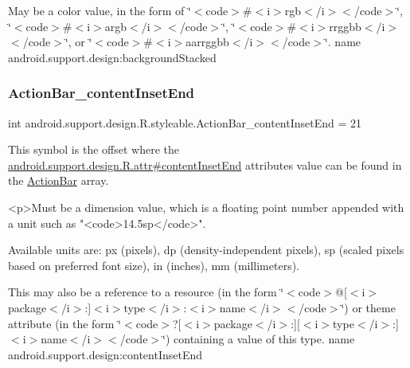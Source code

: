 May be a color value, in the form of \char`\"{}$<$code$>$\#$<$i$>$rgb$<$/i$>$$<$/code$>$\char`\"{}, \char`\"{}$<$code$>$\#$<$i$>$argb$<$/i$>$$<$/code$>$\char`\"{}, \char`\"{}$<$code$>$\#$<$i$>$rrggbb$<$/i$>$$<$/code$>$\char`\"{}, or \char`\"{}$<$code$>$\#$<$i$>$aarrggbb$<$/i$>$$<$/code$>$\char`\"{}.  name android.\+support.\+design\+:background\+Stacked \mbox{\label{classandroid_1_1support_1_1design_1_1R_1_1styleable_afbb050c8aaf116cb242a091ccb7c5494}} 
\subsubsection{\texorpdfstring{Action\+Bar\+\_\+content\+Inset\+End}{ActionBar\_contentInsetEnd}}
{\footnotesize\ttfamily int android.\+support.\+design.\+R.\+styleable.\+Action\+Bar\+\_\+content\+Inset\+End = 21\hspace{0.3cm}{\ttfamily [static]}}

This symbol is the offset where the \hyperlink{classandroid_1_1support_1_1design_1_1R_1_1attr_a344dc4ed8f3a982023c3679ecac0347f}{android.\+support.\+design.\+R.\+attr\#content\+Inset\+End} attribute\textquotesingle{}s value can be found in the \hyperlink{classandroid_1_1support_1_1design_1_1R_1_1styleable_ab795220a96557d11f8c21359b95bed82}{Action\+Bar} array.

\begin{DoxyVerb}      <p>Must be a dimension value, which is a floating point number appended with a unit such as "<code>14.5sp</code>".
\end{DoxyVerb}
 Available units are\+: px (pixels), dp (density-\/independent pixels), sp (scaled pixels based on preferred font size), in (inches), mm (millimeters). 

This may also be a reference to a resource (in the form \char`\"{}$<$code$>$@\mbox{[}$<$i$>$package$<$/i$>$\+:\mbox{]}$<$i$>$type$<$/i$>$\+:$<$i$>$name$<$/i$>$$<$/code$>$\char`\"{}) or theme attribute (in the form \char`\"{}$<$code$>$?\mbox{[}$<$i$>$package$<$/i$>$\+:\mbox{]}\mbox{[}$<$i$>$type$<$/i$>$\+:\mbox{]}$<$i$>$name$<$/i$>$$<$/code$>$\char`\"{}) containing a value of this type.  name android.\+support.\+design\+:content\+Inset\+End \mbox{\label{classandroid_1_1support_1_1design_1_1R_1_1styleable_ac3914ae6a9e8b6f287ff67404ab1e659}} 
